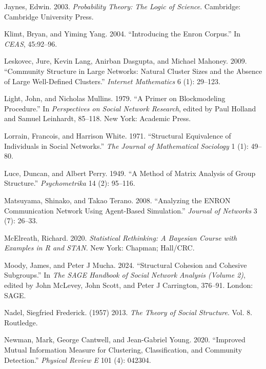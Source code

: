 \documentclass[
  12pt,
  a4paper,
  DIV=11,
  numbers=noendperiod,
  twoside,
  open=any]{scrartcl}
\newlength{\cslhangindent}
\newenvironment{CSLReferences}[2] %
 {\begin{list}{}{%
  \setlength{\itemindent}{0pt}
  \setlength{\leftmargin}{0pt}
  \setlength{\parsep}{0pt}
  \ifodd #1
   \setlength{\leftmargin}{\cslhangindent}
   \setlength{\itemindent}{-1\cslhangindent}
  \fi
  \setlength{\itemsep}{#2\baselineskip}}}
 {\end{list}}
\begin{document}
\begin{CSLReferences}{1}{0}
Jaynes, Edwin. 2003. \emph{Probability Theory: The Logic of Science}.
Cambridge: Cambridge University Press.

Klimt, Bryan, and Yiming Yang. 2004. {``Introducing the Enron Corpus.''}
In \emph{CEAS}, 45:92--96.

Leskovec, Jure, Kevin Lang, Anirban Dasgupta, and Michael Mahoney. 2009.
{``Community Structure in Large Networks: Natural Cluster Sizes and the
Absence of Large Well-Defined Clusters.''} \emph{Internet Mathematics} 6
(1): 29--123.

Light, John, and Nicholas Mullins. 1979. {``A Primer on Blockmodeling
Procedure.''} In \emph{Perspectives on Social Network Research}, edited
by Paul Holland and Samuel Leinhardt, 85--118. New York: Academic Press.

Lorrain, Francois, and Harrison White. 1971. {``Structural Equivalence
of Individuals in Social Networks.''} \emph{The Journal of Mathematical
Sociology} 1 (1): 49--80.

Luce, Duncan, and Albert Perry. 1949. {``A Method of Matrix Analysis of
Group Structure.''} \emph{Psychometrika} 14 (2): 95--116.

Matsuyama, Shinako, and Takao Terano. 2008. {``Analyzing the ENRON
Communication Network Using Agent-Based Simulation.''} \emph{Journal of
Networks} 3 (7): 26--33.

McElreath, Richard. 2020. \emph{Statistical Rethinking: A Bayesian
Course with Examples in {R} and STAN}. New York: Chapman; Hall/CRC.

Moody, James, and Peter J Mucha. 2024. {``Structural Cohesion and
Cohesive Subgroups.''} In \emph{The SAGE Handbook of Social Network
Analysis (Volume 2)}, edited by John McLevey, John Scott, and Peter J
Carrington, 376--91. London: SAGE.

Nadel, Siegfried Frederick. (1957) 2013. \emph{The Theory of Social
Structure}. Vol. 8. Routledge.

Newman, Mark, George Cantwell, and Jean-Gabriel Young. 2020. {``Improved
Mutual Information Measure for Clustering, Classification, and Community
Detection.''} \emph{Physical Review E} 101 (4): 042304.


\end{CSLReferences}
\end{document}
